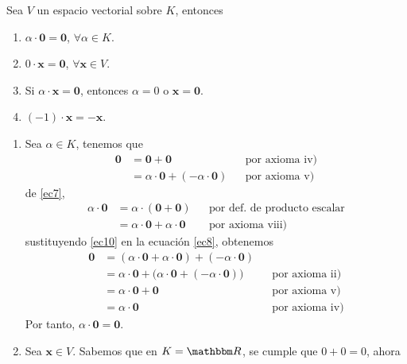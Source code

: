 \begin{theorem}{}{}
    Sea $V$ un espacio vectorial sobre $K$, entonces
    \begin{enumerate}[label=\roman*., topsep=6pt, itemsep=0pt]
        \item $\alpha \cdot \mathbf{0} = \mathbf{0}$, $\forall \alpha \in K$.
        \item $0 \cdot \mathbf{x} = \mathbf{0}$, $\forall \mathbf{x} \in V$.
        \item Si $\alpha \cdot \mathbf{x} = \mathbf{0}$, entonces $\alpha = 0$ o $\mathbf{x} = \mathbf{0}$.
        \item $(-1) \cdot \mathbf{x} = - \mathbf{x}$.
    \end{enumerate}

    \tcblower
    \demostracion
    \begin{enumerate}[label=\roman*., topsep=6pt, itemsep=0pt]
        \item Sea $\alpha \in K$, tenemos que
        \begin{align}
            \mathbf{0} & = \mathbf{0} + \mathbf{0} && \text{por axioma iv)} \label{ec7} \\
            & = \alpha \cdot \mathbf{0} + (-\alpha \cdot \mathbf{0}) && \text{por axioma v)} \label{ec8}
        \end{align}
        de \eqref{ec7},
        \begin{align}
            \alpha \cdot \mathbf{0} & = \alpha \cdot (\mathbf{0} + \mathbf{0}) && \text{por def. de producto escalar} \label{ec9} \\
            & = \alpha \cdot \mathbf{0} + \alpha \cdot \mathbf{0} && \text{por axioma viii)} \label{ec10}
        \end{align}
        sustituyendo \eqref{ec10} en la ecuación \eqref{ec8}, obtenemos
        \begin{align*}
            \mathbf{0} & = (\alpha \cdot \mathbf{0} + \alpha \cdot \mathbf{0}) + (-\alpha \cdot \mathbf{0}) \\
            & = \alpha \cdot \mathbf{0} + \big( \alpha \cdot \mathbf{0} + (-\alpha \cdot \mathbf{0}) \big) && \text{por axioma ii)} \\
            & = \alpha \cdot \mathbf{0} + \mathbf{0} && \text{por axioma v)} \\
            & = \alpha \cdot \mathbf{0} && \text{por axioma iv)}
        \end{align*}
        Por tanto, $\alpha \cdot \mathbf{0} = \mathbf{0}$.
        \item Sea $\mathbf{x} \in V$. Sabemos que en $K = \RR$, se cumple que $0 + 0 = 0$, ahora

\end{enumerate}
\end{theorem}
